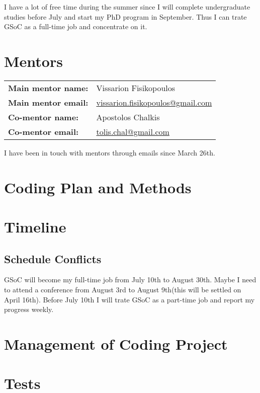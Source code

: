 \documentclass[11pt]{article}
\begin{document}
I have a lot of free time during the summer since I will complete undergraduate studies before July and start my PhD program in September. Thus I can trate GSoC as a full-time job and concentrate on it.

\section{Mentors}
\begin{table}[H]
    \large
    \begin{tabular}{l p{12cm}}
    \textbf{Main mentor name:} & Vissarion Fisikopoulos \\ 
    \textbf{Main mentor email:} & \href{mailto:vissarion.fisikopoulos@gmail.com}{vissarion.fisikopoulos@gmail.com}\\
    \textbf{Co-mentor name:} & Apostolos Chalkis \\ 
    \textbf{Co-mentor email:} & \href{mailto:tolis.chal@gmail.com}{tolis.chal@gmail.com}\\
    \end{tabular}%
\end{table}
I have been in touch with mentors through emails since March 26th.
\section{Coding Plan and Methods}
\section{Timeline}
\subsection{Schedule Conflicts}
    GSoC will become my full-time job from July 10th to August 30th. Maybe I need to attend a conference from August 3rd to August 9th(this will be settled on April 16th). Before July 10th I will trate GSoC as a part-time job and report my progress weekly.
\section{Management of Coding Project}
\section{Tests}
\end{document}
